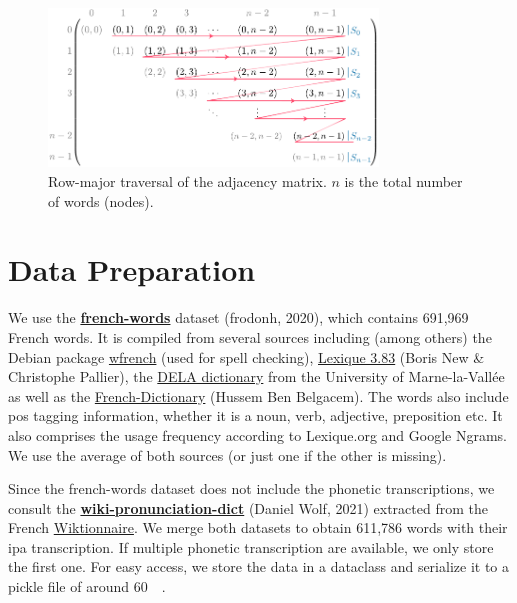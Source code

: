 \begin{figure}
    \centering
    \includegraphics[width=0.78\textwidth]{assets/illustrator/traverse-schema.pdf}
    \caption{Row-major traversal of the adjacency matrix. $n$ is the total number of words (\ie nodes).}
    \label{fig:traverse-schema}
\end{figure}

\section{Data Preparation}
\label{sec:data}

We use the \href{https://github.com/frodonh/french-words}{\textbf{french-words}} dataset (frodonh, 2020), which contains 691,969 French words. It is compiled from several sources including (among others) the Debian package \href{https://packages.debian.org/fr/sid/wfrench}{wfrench} (used for spell checking), \href{http://www.lexique.org/}{Lexique 3.83} (Boris New \& Christophe Pallier), the \href{https://infolingu.univ-mlv.fr/DonneesLinguistiques/Dictionnaires/telechargement.html}{DELA dictionary} from the University of Marne-la-Vallée as well as the \href{https://github.com/hbenbel/French-Dictionary}{French-Dictionary} (Hussem Ben Belgacem). The words also include \acrfull{pos} tagging information, \eg whether it is a noun, verb, adjective, preposition etc. It also comprises the usage frequency according to Lexique.org and Google Ngrams. We use the average of both sources (or just one if the other is missing).

Since the french-words dataset does not include the phonetic transcriptions, we consult the \href{https://github.com/DanielSWolf/wiki-pronunciation-dict}{\textbf{wiki-pronunciation-dict}} (Daniel Wolf, 2021) extracted from the French \href{https://fr.wiktionary.org/}{Wiktionnaire}. We merge both datasets to obtain 611,786 words with their \gls{ipa} transcription. If multiple phonetic transcription are available, we only store the first one. For easy access, we store the data in a dataclass and serialize it to a pickle file of around \qty{60}{\mega\byte}.

